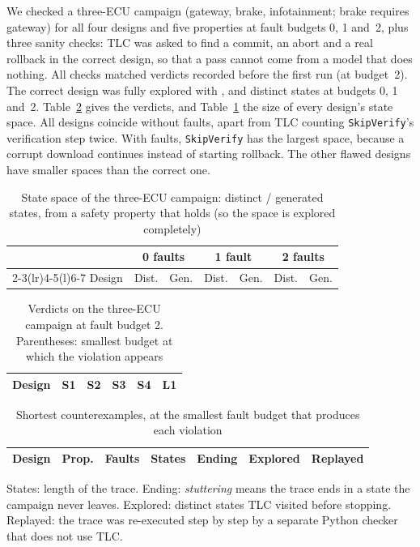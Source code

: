 \documentclass[journal]{IEEEtran}
\begin{document}
We checked a three-ECU campaign (gateway, brake, infotainment; brake requires gateway) for all four designs and five properties at fault budgets 0, 1 and~2, plus three sanity checks: TLC was asked to find a commit, an abort and a real rollback in the correct design, so that a pass cannot come from a model that does nothing. All \EzeroChecks{} checks matched verdicts recorded before the first run (at budget~2). The correct design was fully explored with \EzeroStatesZero{}, \EzeroStatesOne{} and \EzeroStatesTwo{} distinct states at budgets 0, 1 and~2. Table~\ref{tab:e0} gives the verdicts, and Table~\ref{tab:space} the size of every design's state space. All designs coincide without faults, apart from TLC counting \texttt{SkipVerify}'s verification step twice. With faults, \texttt{SkipVerify} has the largest space, because a corrupt download continues instead of starting rollback. The other flawed designs have smaller spaces than the correct one.

\begin{table}[t]
\caption{State space of the three-ECU campaign: distinct / generated states, from a safety property that holds (so the space is explored completely)}
\label{tab:space}
\centering
\footnotesize
\setlength{\tabcolsep}{2.5pt}
\begin{tabular}{@{}lrrrrrr@{}}
\toprule
& \multicolumn{2}{c}{0 faults} & \multicolumn{2}{c}{1 fault} & \multicolumn{2}{c}{2 faults} \\
\cmidrule(lr){2-3}\cmidrule(lr){4-5}\cmidrule(l){6-7}
Design & Dist. & Gen. & Dist. & Gen. & Dist. & Gen. \\
\midrule

\end{tabular}
\end{table}

\begin{table}[t]
\caption{Verdicts on the three-ECU campaign at fault budget 2. Parentheses: smallest budget at which the violation appears}
\label{tab:e0}
\centering
\scriptsize
\setlength{\tabcolsep}{2.5pt}
\begin{tabular}{@{}lccccc@{}}
\toprule
Design & S1 & S2 & S3 & S4 & L1 \\
\midrule

\end{tabular}
\end{table}

\begin{table}[t]
\caption{Shortest counterexamples, at the smallest fault budget that produces each violation}
\label{tab:cex}
\centering
\footnotesize
\setlength{\tabcolsep}{3pt}
\begin{tabular}{@{}llrrlrc@{}}
\toprule
Design & Prop. & Faults & States & Ending & Explored & Replayed \\
\midrule

\end{tabular}

\smallskip
\raggedright\scriptsize States: length of the trace. Ending: \emph{stuttering} means the trace ends in a state the campaign never leaves. Explored: distinct states TLC visited before stopping. Replayed: the trace was re-executed step by step by a separate Python checker that does not use TLC.
\end{table}
\end{document}
